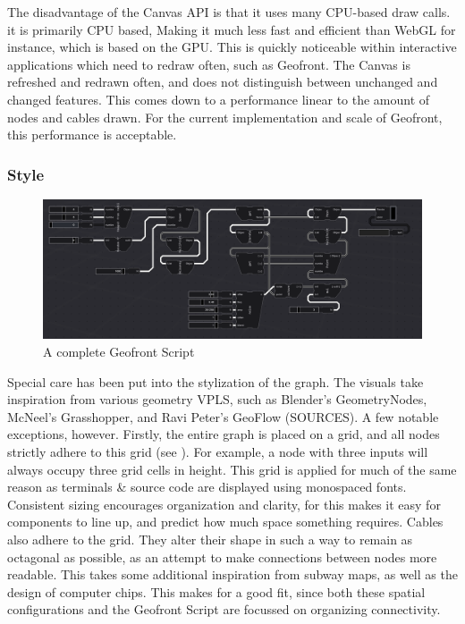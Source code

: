 The disadvantage of the Canvas API is that it uses many CPU-based draw calls. it is primarily CPU based, Making it much less fast and efficient than WebGL for instance, which is based on the GPU. 
This is quickly noticeable within interactive applications which need to redraw often, such as Geofront. 
The Canvas is refreshed and redrawn often, and does not distinguish between unchanged and changed features. 
This comes down to a performance linear to the amount of nodes and cables drawn. For the current implementation and scale of Geofront, this performance is acceptable. 

\subsubsection*{ Style }

\begin{figure}
  \centering
  \graphicspath{ {../../assets/images/implementation/} }
  \includegraphics[width=\linewidth]{a-full-graph.png}
  \caption[Shim Classes]{A complete Geofront Script}
  \label{fig:a-full-graph}
\end{figure}

Special care has been put into the stylization of the graph.
The visuals take inspiration from various geometry VPLS, such as Blender's GeometryNodes, McNeel's Grasshopper, and Ravi Peter's GeoFlow (SOURCES). 
A few notable exceptions, however. 
Firstly, the entire graph is placed on a grid, and all nodes strictly adhere to this grid (see ). 
For example, a node with three inputs will always occupy three grid cells in height. 
This grid is applied for much of the same reason as terminals \& source code are displayed using monospaced fonts. 
Consistent sizing encourages organization and clarity, for this makes it easy for components to line up, and predict how much space something requires.  
Cables also adhere to the grid. They alter their shape in such a way to remain as octagonal as possible, as an attempt to make connections between nodes more readable.
This takes some additional inspiration from subway maps, as well as the design of computer chips. This makes for a good fit, since both these spatial configurations and the Geofront Script are focussed on organizing connectivity.

